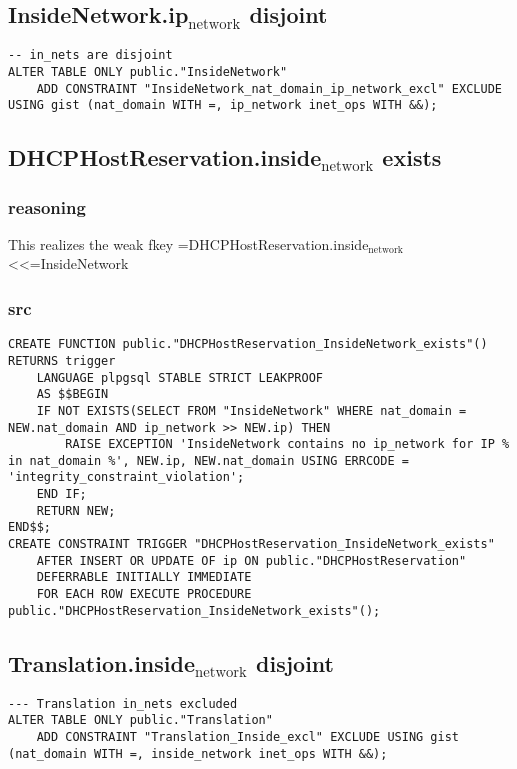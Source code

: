 \documentclass[11pt]{article}
\begin{document}
\subsection{InsideNetwork.ip\(_{\text{network}}\) disjoint}
\label{sec:orgd5424e7}
\begin{verbatim}
-- in_nets are disjoint
ALTER TABLE ONLY public."InsideNetwork"
    ADD CONSTRAINT "InsideNetwork_nat_domain_ip_network_excl" EXCLUDE USING gist (nat_domain WITH =, ip_network inet_ops WITH &&);
\end{verbatim}

\subsection{DHCPHostReservation.inside\(_{\text{network}}\) exists}
\label{sec:org07fb136}
\subsubsection{reasoning}
\label{sec:orge2a68da}
This realizes the weak fkey =DHCPHostReservation.inside\(_{\text{network}}\)<<=InsideNetwork

\subsubsection{src}
\label{sec:orgcae1707}
\begin{verbatim}
CREATE FUNCTION public."DHCPHostReservation_InsideNetwork_exists"() RETURNS trigger
    LANGUAGE plpgsql STABLE STRICT LEAKPROOF
    AS $$BEGIN
	IF NOT EXISTS(SELECT FROM "InsideNetwork" WHERE nat_domain = NEW.nat_domain AND ip_network >> NEW.ip) THEN
		RAISE EXCEPTION 'InsideNetwork contains no ip_network for IP % in nat_domain %', NEW.ip, NEW.nat_domain USING ERRCODE = 'integrity_constraint_violation';
	END IF;
	RETURN NEW;
END$$;
CREATE CONSTRAINT TRIGGER "DHCPHostReservation_InsideNetwork_exists"
    AFTER INSERT OR UPDATE OF ip ON public."DHCPHostReservation"
    DEFERRABLE INITIALLY IMMEDIATE
    FOR EACH ROW EXECUTE PROCEDURE public."DHCPHostReservation_InsideNetwork_exists"();
\end{verbatim}
\subsection{Translation.inside\(_{\text{network}}\) disjoint}
\label{sec:org4a94190}
\begin{verbatim}
--- Translation in_nets excluded
ALTER TABLE ONLY public."Translation"
    ADD CONSTRAINT "Translation_Inside_excl" EXCLUDE USING gist (nat_domain WITH =, inside_network inet_ops WITH &&);
\end{verbatim}
\end{document}
